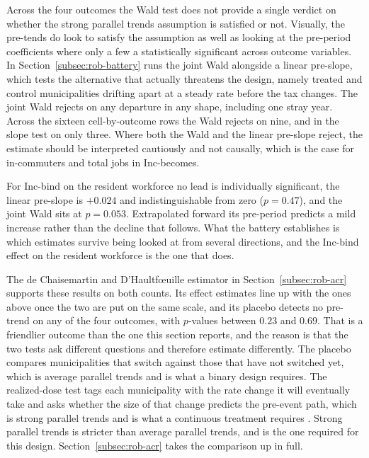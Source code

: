 \documentclass[12pt]{article}
\begin{document}
Across the four outcomes the Wald test does not provide a single verdict on whether the strong parallel trends assumption is satisfied or not. Visually, the pre-tends do look to satisfy the assumption as well as looking at the pre-period coefficients where only a few a statistically significant across outcome variables. In Section~\ref{subsec:rob-battery} runs the joint
Wald alongside a linear pre-slope, which tests the alternative that
actually threatens the design, namely treated and control municipalities
drifting apart at a steady rate before the tax changes. The joint Wald
rejects on any departure in any shape, including one stray year. Across
the sixteen cell-by-outcome rows the Wald rejects on nine, and in the slope test on only
three. Where both the Wald and the linear pre-slope reject, the estimate should be interpreted cautiously and 
not causally, which is the case for in-commuters and total jobs in
Inc-becomes.

For Inc-bind on the resident workforce no lead is individually
significant, the linear pre-slope is $+0.024$ and indistinguishable from
zero ($p = 0.47$), and the joint Wald sits at $p = 0.053$. Extrapolated
forward its pre-period predicts a mild increase rather than the decline
that follows.
What the battery establishes is which estimates survive being looked at
from several directions, and the Inc-bind effect on the resident workforce
is the one that does.

The de Chaisemartin and D'Haultf\oe uille estimator in
Section~\ref{subsec:rob-acr} supports these results on both counts. Its effect estimates line up with the ones above once the two
are put on the same scale, and its placebo detects no pre-trend on any of
the four outcomes, with $p$-values between $0.23$ and $0.69$. That is a
friendlier outcome than the one this section reports, and the reason is
that the two tests ask different questions and therefore estimate differently. The placebo compares
municipalities that switch against those that have not switched yet, which
is average parallel trends and is what a binary design requires. The
realized-dose test tags each municipality with the rate change it will
eventually take and asks whether the size of that change predicts the
pre-event path, which is strong parallel trends and is what a continuous
treatment requires
\citep{callawayDifferenceindifferencesContinuousTreatment2024}. Strong parallel trends is stricter than average parallel trends, and is the one required for this design.
Section~\ref{subsec:rob-acr} takes the comparison up in full.
\end{document}
